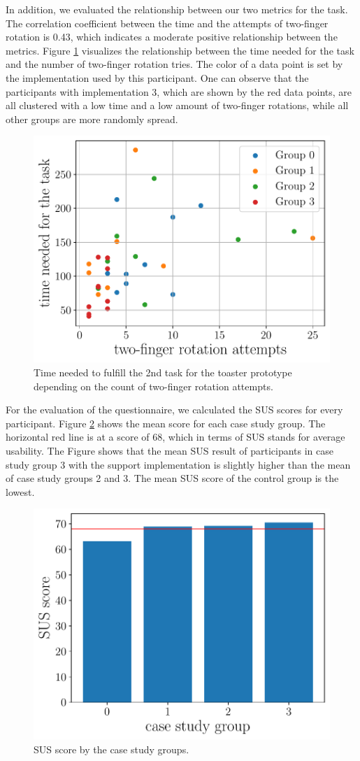 \documentclass[11pt, a4paper]{article}
\begin{document}
			In addition, we evaluated the relationship between our two metrics for the task. The correlation coefficient between the time and the attempts of two-finger rotation is 0.43, which indicates a moderate positive relationship between the metrics. Figure \ref{fig:scatter} visualizes the relationship between the time needed for the task and the number of two-finger rotation tries. The color of a data point is set by the implementation used by this participant. One can observe that the participants with implementation 3, which are shown by the red data points, are all clustered with a low time and a low amount of two-finger rotations, while all other groups are more randomly spread.

			\begin{figure}[H]
				\centering
				\includegraphics[width=.49\textwidth]{img/plot/plot_scatter.pdf}
				\caption{Time needed to fulfill the 2nd task for the toaster prototype depending on the count of two-finger rotation attempts.}
				\label{fig:scatter}
			\end{figure}

			For the evaluation of the questionnaire, we calculated the \ac{SUS} scores for every participant. Figure \ref{fig:sus} shows the mean score for each case study group. The horizontal red line is at a score of 68, which in terms of \ac{SUS} stands for average usability. The Figure shows that the mean \ac{SUS} result of participants in case study group 3 with the support implementation is slightly higher than the mean of case study groups 2 and 3. The mean \ac{SUS} score of the control group is the lowest.

			\begin{figure}[H]
				\centering
				\includegraphics[width=.49\textwidth]{img/plot/plot_sus.pdf}
				\caption{SUS score by the case study groups.}
				\label{fig:sus}
			\end{figure}
\end{document}
